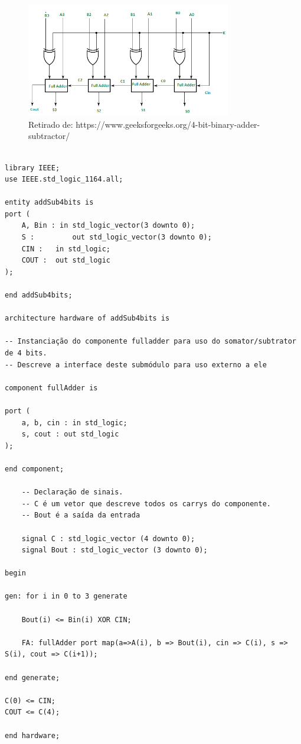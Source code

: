 \documentclass{article}
\begin{document}
\begin{center}
\begin{figure}
\includegraphics[width=0.8\textwidth]{img/AddSub4bits.png}
\caption{Retirado de: https://www.geeksforgeeks.org/4-bit-binary-adder-subtractor/ }
\end{figure}
\end{center}

\begin{verbatim}

library IEEE;
use IEEE.std_logic_1164.all;

entity addSub4bits is
port (
	A, Bin : in std_logic_vector(3 downto 0);
	S : 		out std_logic_vector(3 downto 0);
	CIN : 	in std_logic;
	COUT : 	out std_logic
);

end addSub4bits;

architecture hardware of addSub4bits is

-- Instanciação do componente fulladder para uso do somator/subtrator de 4 bits.
-- Descreve a interface deste submódulo para uso externo a ele

component fullAdder is 

port (
	a, b, cin : in std_logic;
	s, cout : out std_logic
);

end component;
	
	-- Declaração de sinais.
	-- C é um vetor que descreve todos os carrys do componente.
	-- Bout é a saída da entrada
	
	signal C : std_logic_vector (4 downto 0);
	signal Bout : std_logic_vector (3 downto 0);

begin

gen: for i in 0 to 3 generate

	Bout(i) <= Bin(i) XOR CIN;

	FA: fullAdder port map(a=>A(i), b => Bout(i), cin => C(i), s => S(i), cout => C(i+1)); 

end generate;

C(0) <= CIN;
COUT <= C(4);
	
end hardware;

\end{verbatim}
\end{document}
